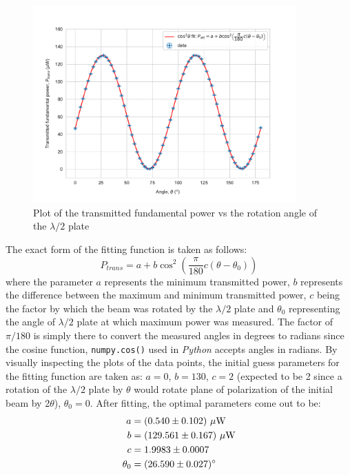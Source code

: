 \begin{figure}[H]
\includegraphics[width=0.9\textwidth]{./imagesandplots/variabattcalib.pdf}
\centering
\caption{Plot of the transmitted fundamental power vs the rotation angle of the $\lambda /2$ plate}
\label{figexpt5}
\end{figure}

The exact form of the fitting function is taken as follows:
\begin{equation}
P_{trans}=a+b\cos^{2}\left(\dfrac{\pi}{180}c(\theta-\theta_{0})\right)
\end{equation}
where the parameter $a$ represents the minimum transmitted power, $b$ represents the difference between the maximum and minimum transmitted power, $c$ being the factor by which the beam was rotated by the $\lambda /2$ plate and $\theta_{0}$ representing the angle of $\lambda /2$ plate at which maximum power was measured. The factor of $\pi / 180$ is simply there to convert the measured angles in degrees to radians since the cosine function, \texttt{numpy.cos()} used in \textit{Python} accepts angles in radians. By visually inspecting the plots of the data points, the initial guess parameters for the fitting function are taken as: $a=0$, $b=130$, $c=2$ (expected to be 2 since a rotation of the $\lambda /2$ plate by $\theta$ would rotate plane of polarization of the initial beam by 2$\theta$), $\theta_{0}=0$. After fitting, the optimal parameters come out to be:
\begin{align*}
a&=(0.540\pm 0.102)\ \mu\rm{W}\\
b&=(129.561\pm 0.167)\ \mu\rm{W}\\
c&=1.9983\pm 0.0007\\
\theta_{0}&=(26.590\pm 0.027)\degree
\end{align*}

